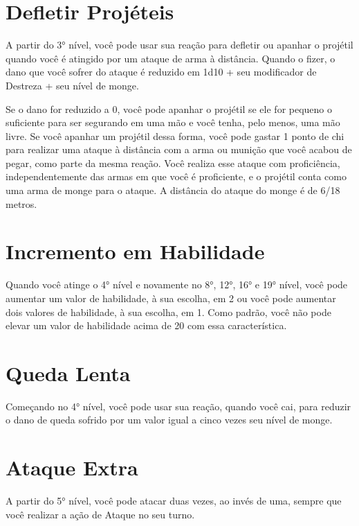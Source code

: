 \begin{multicols}{2}
\section*{Defletir Projéteis}%
\label{sec:defletir_projeteis}

A partir do 3° nível, você pode usar sua reação para defletir ou apanhar o
projétil quando você é atingido por um ataque de arma à distância. Quando o
fizer, o dano que você sofrer do ataque é reduzido em 1d10 + seu modificador de
Destreza + seu nível de monge.

Se o dano for reduzido a 0, você pode apanhar o projétil se ele for pequeno o
suficiente para ser segurando em uma mão e você tenha, pelo menos, uma mão
livre. Se você apanhar um projétil dessa forma, você pode gastar 1 ponto de chi
para realizar uma ataque à distância com a arma ou munição que você acabou de
pegar, como parte da mesma reação. Você realiza esse ataque com proficiência,
independentemente das armas em que você é proficiente, e o projétil conta como
uma arma de monge para o ataque. A distância do ataque do monge é de 6/18
metros.

\section*{Incremento em Habilidade}%
\label{sec:incremento_em_habilidade}

Quando você atinge o 4° nível e novamente no 8°, 12°, 16° e 19° nível, você pode
aumentar um valor de habilidade, à sua escolha, em 2 ou você pode aumentar dois
valores de habilidade, à sua escolha, em 1. Como padrão, você não pode elevar um
valor de habilidade acima de 20 com essa característica.

\section*{Queda Lenta}%
\label{sec:queda_lenta}

Começando no 4° nível, você pode usar sua reação, quando você cai, para reduzir
o dano de queda sofrido por um valor igual a cinco vezes seu nível de monge.

\section*{Ataque Extra}%
\label{sec:ataque_extra}

A partir do 5° nível, você pode atacar duas vezes, ao invés de uma, sempre que
você realizar a ação de Ataque no seu turno.


\end{multicols}
